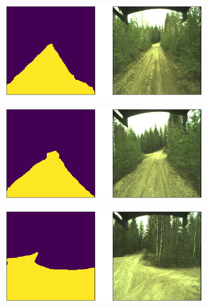 \documentclass[USenglish]{ifimaster}  %
\begin{document}
\begin{appendices}
\begin{figure}[ht]
\begin{subfigure}[b]{\textwidth}
\end{subfigure}
\end{figure}

\begin{figure}[ht]
\centering
\begin{subfigure}[b]{\textwidth}
\centering
\includegraphics[width=0.95\textwidth]{bilder/appendix_1/2017-05-09-13-26-47-00234.png}
\end{subfigure}
\hfill
\begin{subfigure}[b]{\textwidth}
\centering
\includegraphics[width=0.95\textwidth]{bilder/appendix_1/2017-05-09-13-26-47-00262.png}
\end{subfigure}
\hfill
\begin{subfigure}[b]{\textwidth}
\centering
\includegraphics[width=0.95\textwidth]{bilder/appendix_1/2017-05-09-13-26-47-00286.png}
\end{subfigure}

\end{figure}
\end{appendices}
\end{document}

